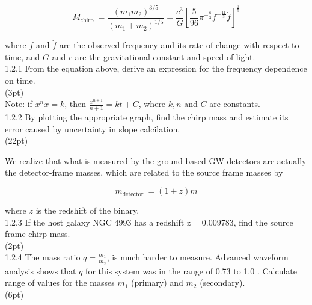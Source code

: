 \documentclass[10pt]{article}
\begin{document}
$$
M_{\text {chirp }}=\frac{\left(m_{1} m_{2}\right)^{3 / 5}}{\left(m_{1}+m_{2}\right)^{1 / 5}}=\frac{c^{3}}{G}\left[\frac{5}{96} \pi^{-\frac{8}{3}} f^{-\frac{11}{3}} \dot{f}\right]^{\frac{3}{5}}
$$

where $f$ and $\dot{f}$ are the observed frequency and its rate of change with respect to time, and $G$ and $c$ are the gravitational constant and speed of light.\\
1.2.1 From the equation above, derive an expression for the frequency dependence on time.\\
(3pt)\\
Note: if $x^{n} \dot{x}=k$, then $\frac{x^{n+1}}{n+1}=k t+C$, where $k, n$ and $C$ are constants.\\
1.2.2 By plotting the appropriate graph, find the chirp mass and estimate its error caused by uncertainty in slope calcilation.\\
(22pt)

We realize that what is measured by the ground-based GW detectors are actually the detector-frame masses, which are related to the source frame masses by

$$
m_{\text {detector }}=(1+z) m
$$

where $z$ is the redshift of the binary.\\
1.2.3 If the host galaxy NGC 4993 has a redshift $\mathrm{z}=0.009783$, find the source frame chirp mass.\\
(2pt)\\
1.2.4 The mass ratio $q=\frac{m_{1}}{m_{2}}$, is much harder to measure. Advanced waveform analysis shows that $q$ for this system was in the range of 0.73 to 1.0 . Calculate range of values for the masses $m_{1}$ (primary) and $m_{2}$ (secondary).\\
(6pt)
\end{document}
